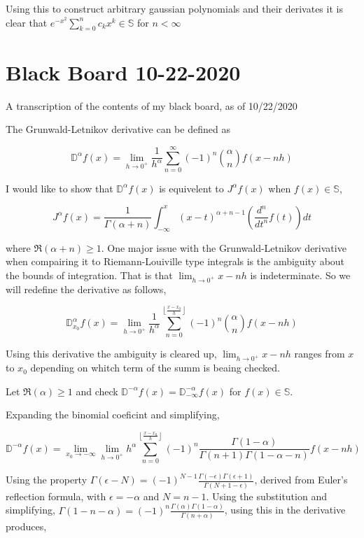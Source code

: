\documentclass[%
 preprint,
 amsmath, amssymb, aps, pra, 10pt
]{revtex4-2}
\begin{document}
Using this to construct arbitrary gaussian polynomials and their derivates it is clear that $e^{-x^2}\sum_{k=0}^n c_k x^k \in \mathbb{S}$ for $n<\infty$



\section{Black Board 10-22-2020}

A transcription of the contents of my black board, as of 10/22/2020

The Grunwald-Letnikov derivative can be defined as

\[\mathbb{D}^{\alpha}f(x) = \lim_{h \to 0^+} \frac{1}{h^{\alpha}} \sum_{n=0}^{\infty} (-1)^n \binom{\alpha}{n} f(x-nh)\]

I would like to show that $\mathbb{D}^{\alpha} f(x)$ is equivelent to $J^{\alpha}f(x)$ when $f(x) \in \mathbb{S}$,

\[J^{\alpha}f(x) = \frac{1}{\Gamma(\alpha + n)} \int_{-\infty}^x (x-t)^{\alpha + n -1} \left( \frac{d^n}{dt^n} f(t) \right) dt\]

where $\mathfrak{R}(\alpha + n) \geq 1$. One major issue with the Grunwald-Letnikov derivative when compairing it to Riemann-Louiville type integrals is the ambiguity about the bounds of integration. That is that $\lim_{h \to 0^+} x-nh$ is indeterminate. So we will redefine the derivative as follows,

\[\mathbb{D}_{x_0}^{\alpha}f(x) = \lim_{h \to 0^+} \frac{1}{h^{\alpha}} \sum_{n=0}^{\left\lfloor \frac{x-x_0}{h} \right\rfloor} (-1)^n \binom{\alpha}{n} f(x-nh)\]

Using this derivative the ambiguity is cleared up, $\lim_{h \to 0^+} x-nh$ ranges from $x$ to $x_0$ depending on whitch term of the summ is beaing checked.

Let $\mathfrak{R}(\alpha) \geq 1$ and check $\mathbb{D}^{-\alpha}f(x) = \mathbb{D}_{-\infty}^{-\alpha}f(x)$ for $f(x) \in \mathbb{S}$.

Expanding the binomial coeficint and simplifying,

\[\mathbb{D}^{-\alpha}f(x) = \lim_{x_0 \to -\infty} \lim_{h \to 0^+} h^{\alpha} \sum_{n=0}^{\left\lfloor \frac{x-x_0}{h} \right\rfloor} (-1)^n \frac{\Gamma(1-\alpha)}{\Gamma(n + 1)\Gamma(1 - \alpha - n)} f(x-nh) \]

Using the property $\Gamma(\epsilon - N) = (-1)^{N-1}\frac{\Gamma(-\epsilon)\Gamma(\epsilon + 1)}{\Gamma(N + 1 - \epsilon)}$, derived from Euler's reflection formula, with $\epsilon = -\alpha$ and $N = n - 1$. Using the substitution and simplifying, $\Gamma(1 - n - \alpha) = (-1)^n\frac{\Gamma(\alpha)\Gamma(1-\alpha)}{\Gamma(n + \alpha)}$, using this in the derivative produces,
\end{document}
